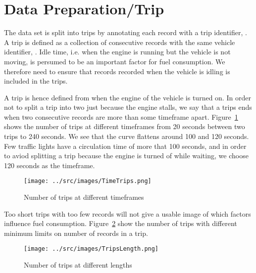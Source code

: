 \section{Data Preparation/Trip}

The data set is split into trips by annotating each record with a trip identifier, \tid.
A trip is defined as a collection of consecutive records with the same vehicle identifier, \vid.
Idle time, i.e. when the engine is running but the vehicle is not moving, is persumed to be an important factor for fuel consumption. 
We therefore need to ensure that records recorded when the vehicle is idling is included in the trips. 

A trip is hence defined from when the engine of the vehicle is turned on.
In order not to split a trip into two just because the engine stalls, we say that a trips ends when two consecutive records are more than some timeframe apart.
Figure~\ref{fig:TimeTrips} shows the number of trips at different timeframes from 20 seconds between two trips to 240 seconds.
We see that the curve flattens around 100 and 120 seconds. 
Few traffic lights have a circulation time of more that 100 seconds, and in order to aviod splitting a trip because the engine is turned of while waiting, we choose 120 seconds as the timeframe. 
\begin{figure}[htb]
\centering
\texttt{[image: ../src/images/TimeTrips.png]}
\caption{Number of trips at different timeframes}
\label{fig:TimeTrips}
\end{figure}

Too short trips with too few records will not give a usable image of which factors influence fuel consumption.
Figure~\ref{fig:LengthTrips} show the number of trips with different minimum limits on number of records in a trip.
\begin{figure}[htb]
\centering
\texttt{[image: ../src/images/TripsLength.png]}
\caption{Number of trips at different lengths}
\label{fig:LengthTrips}
\end{figure}